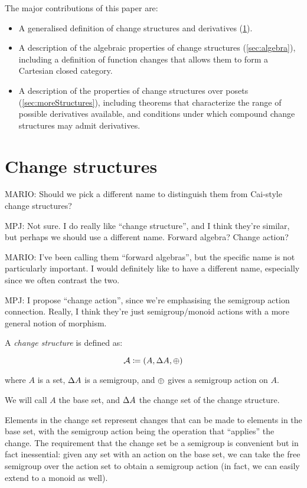 The major contributions of this paper are:
\begin{itemize}
  \item A generalised definition of change structures and derivatives
    (\ref{sec:change-structures}).
  \item A description of the algebraic properties of change structures (\ref{sec:algebra}), including
    a definition of function changes that allows them to form a Cartesian closed
    category.
  \item A description of the properties of change structures over posets
    (\ref{sec:moreStructures}), including theorems that characterize the range of
    possible derivatives available, and conditions under which compound change
    structures may admit derivatives.
\end{itemize}

\section{Change structures}
\label{sec:change-structures}

MARIO: Should we pick a different name to distinguish them from Cai-style change structures?

MPJ: Not sure. I do really like ``change structure'', and I think they're
similar, but perhaps we should use a different name. Forward algebra? Change action?

MARIO: I've been calling them ``forward algebras'', but the specific name is not particularly
important. I would definitely like to have a different name, especially since we often contrast the two.

MPJ: I propose ``change action'', since we're emphasising the semigroup action
connection. Really, I think they're just semigroup/monoid actions with a more
general notion of morphism.

\begin{defn}
  A \textit{change structure} is defined as:

  $$\mathcal{A} \coloneqq (A,\Delta A,\oplus)$$

  where $A$ is a set, $\Delta A$ is a semigroup, and $\oplus$ gives a semigroup action on $A$.

  We will call $A$ the base set, and $\Delta A$ the change set of the change structure.
\end{defn}

Elements in the change set represent changes that can be made to elements in the
base set, with the semigroup action being the operation that ``applies'' the
change. The requirement that the change set be a semigroup is convenient but in
fact inessential: given any set with an action on the base set, we can take the
free semigroup over the action set to obtain a semigroup action (in fact, we can
easily extend to a monoid as well).

